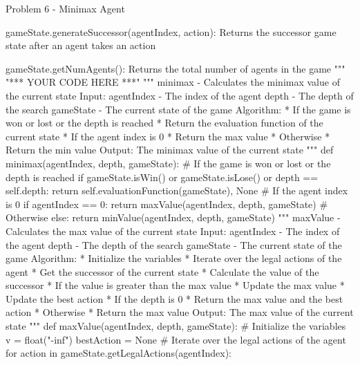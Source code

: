 \begin{problem}{Problem 6 - Minimax Agent}
\begin{highlight}[Solution]
\begin{code}[Python]
        gameState.generateSuccessor(agentIndex, action):
            Returns the successor game state after an agent takes an action

        gameState.getNumAgents():
            Returns the total number of agents in the game
        """
        "*** YOUR CODE HERE ***"
        """ minimax - Calculates the minimax value of the current state
                Input:
                agentIndex - The index of the agent
                depth - The depth of the search
                gameState - The current state of the game
                Algorithm:
                * If the game is won or lost or the depth is reached
                    * Return the evaluation function of the current state
                * If the agent index is 0
                    * Return the max value
                * Otherwise
                    * Return the min value
                Output:
                The minimax value of the current state
        """
        def minimax(agentIndex, depth, gameState):
            # If the game is won or lost or the depth is reached
            if gameState.isWin() or gameState.isLose() or depth == self.depth:
                return self.evaluationFunction(gameState), None
            # If the agent index is 0
            if agentIndex == 0:
                return maxValue(agentIndex, depth, gameState)
            # Otherwise
            else:
                return minValue(agentIndex, depth, gameState)
        """ maxValue - Calculates the max value of the current state
                Input:
                agentIndex - The index of the agent
                depth - The depth of the search
                gameState - The current state of the game
                Algorithm:
                * Initialize the variables
                * Iterate over the legal actions of the agent
                    * Get the successor of the current state
                    * Calculate the value of the successor
                    * If the value is greater than the max value
                    * Update the max value
                    * Update the best action
                * If the depth is 0
                    * Return the max value and the best action
                * Otherwise
                    * Return the max value
                Output:
                The max value of the current state
        """
        def maxValue(agentIndex, depth, gameState):
            # Initialize the variables
            v = float("-inf")
            bestAction = None
            # Iterate over the legal actions of the agent
            for action in gameState.getLegalActions(agentIndex):

\end{code}
\end{highlight}
\end{problem}

